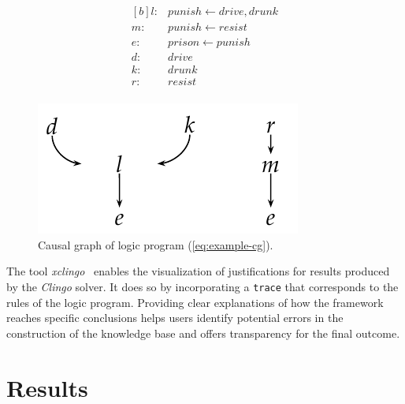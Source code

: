 \documentclass[11pt,leqno]{amsart}
\newcommand{\src}[1]{\texttt{#1}}
\begin{document}
\begin{figure}[!h]
    \centering
    \begin{minipage}{0.48\textwidth}
    \begin{equation}
    \begin{aligned}[b]
        l :& punish \longleftarrow drive, drunk \\
        m :& punish \longleftarrow resist \\
        e :& prison \longleftarrow punish \\
        d :& drive \\
        k :& drunk \\
        r :& resist \\
    \end{aligned}
    \label{eq:example-cg}
    \end{equation}
    \end{minipage}
    \hfill
    \begin{minipage}{0.48\textwidth}
    \centering
    \includegraphics[width=\textwidth]{assets/causal_g.pdf}
    \caption{Causal graph of logic program (\cref{eq:example-cg}).}
    \label{fig:causal-g}
    \end{minipage}
    \end{figure}
    

The tool \textit{xclingo}~\cite{Cabalar_2020} 
enables the visualization of justifications for results produced by the \textit{Clingo} solver. 
It does so by incorporating a \src{trace} that corresponds to the rules of the logic program. 
Providing clear explanations of how the framework reaches specific conclusions helps users identify 
potential errors in the construction of the knowledge base and offers transparency for the final outcome. 

\section{Results}\label{sec:results}
\end{document}
